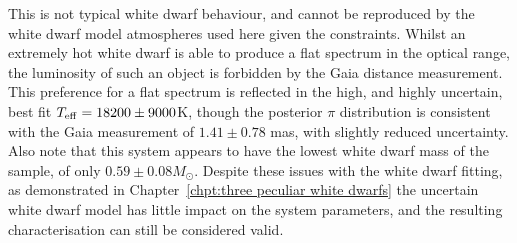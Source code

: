 This is not typical white dwarf behaviour, and cannot be reproduced by the white dwarf model atmospheres used here given the constraints. Whilst an extremely hot white dwarf is able to produce a flat spectrum in the optical range, the luminosity of such an object is forbidden by the Gaia distance measurement.
This preference for a flat spectrum is reflected in the high, and highly uncertain, best fit $T_{\rm eff} = 18200 \pm 9000$K, though the posterior $\pi$ distribution is consistent with the Gaia measurement of $1.41\pm0.78$ mas, with slightly reduced uncertainty. Also note that this system appears to have the lowest white dwarf mass of the sample, of only $0.59\pm0.08 M_\odot$.
Despite these issues with the white dwarf fitting, as demonstrated in Chapter~\ref{chpt:three peculiar white dwarfs} the uncertain white dwarf model has little impact on the system parameters, and the resulting characterisation can still be considered valid.


%     

